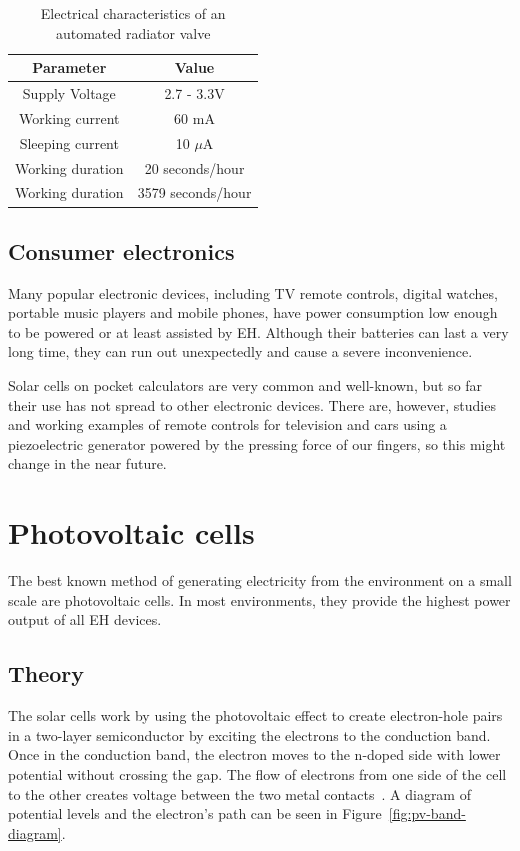 \documentclass[a4paper,10pt]{article}
\begin{document}
\begin{table}[h]
  \centering
  \begin{tabular}{|c|c|}
\hline
    Parameter & Value \\
\hline
Supply Voltage & 2.7 - 3.3V \\
Working current & 60 mA \\
Sleeping current & 10 $\mu$A \\
Working duration & 20 seconds/hour \\
Working duration & 3579 seconds/hour \\
\hline
  \end{tabular}
\caption{Electrical characteristics of an automated radiator valve}
\label{tab:zbarv}
\end{table}

\subsection{Consumer electronics}

Many popular electronic devices, including TV remote controls, digital watches, portable music players and mobile phones, have power consumption low enough to be powered or at least assisted by \ac{EH}. Although their batteries can last a very long time, they can run out unexpectedly and cause a severe inconvenience. 

Solar cells on pocket calculators are very common and well-known, but so far their use has not spread to other electronic devices. There are, however, studies and working examples of remote controls for television and cars using a piezoelectric generator powered by the pressing force of our fingers, so this might change in the near future. 

\section{Photovoltaic cells}

The best known method of generating electricity from the environment on a small scale are photovoltaic cells. In most environments, they provide the highest power output of all \ac{EH} devices. 

\subsection{Theory}

The solar cells work by using the photovoltaic effect to create electron-hole pairs in a two-layer semiconductor by exciting the electrons to the conduction band. Once in the conduction band, the electron moves to the n-doped side with lower potential without crossing the gap. The flow of electrons from one side of the cell to the other creates voltage between the two metal contacts~\cite{wiki:solar-cells}. A diagram of potential levels and the electron's path can be seen in Figure~\ref{fig:pv-band-diagram}. 
\end{document}
